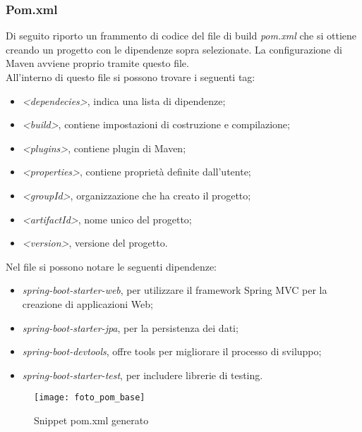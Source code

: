 \subsubsection{Pom.xml}
Di seguito riporto un frammento di codice del file di build \textit{pom.xml} che si ottiene creando un progetto con le dipendenze sopra selezionate. La configurazione di Maven avviene proprio tramite questo file.\\
All'interno di questo file si possono trovare i seguenti tag:
\begin{itemize}
\item \textit{<dependecies>}, indica una lista di dipendenze;
\item \textit{<build>}, contiene impostazioni di costruzione e compilazione;
\item \textit{<plugins>}, contiene plugin di Maven;
\item \textit{<properties>}, contiene proprietà definite dall'utente;
\item \textit{<groupId>}, organizzazione che ha creato il progetto;
\item \textit{<artifactId>}, nome unico del progetto;
\item \textit{<version>},  versione del progetto.
\end{itemize}

\noindent Nel file si possono notare le seguenti dipendenze:
\begin{itemize}
\item \textit{spring-boot-starter-web}, per utilizzare il framework Spring MVC per la creazione di applicazioni Web;
\item \textit{spring-boot-starter-jpa}, per la persistenza dei dati;
\item \textit{spring-boot-devtools}, offre tools per migliorare il processo di sviluppo;
\item \textit{spring-boot-starter-test}, per includere librerie di testing.
\end{itemize}

\begin{figure}[H] 
    \centering 
    \texttt{[image: foto\_pom\_base]} 
    \caption{Snippet pom.xml generato}
\end{figure}

